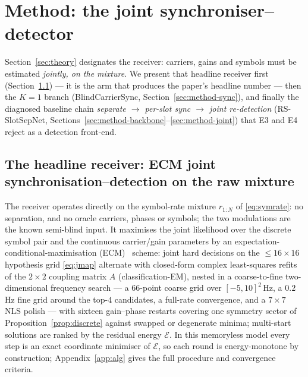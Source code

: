 \documentclass[journal]{IEEEtran}
\begin{document}
\section{Method: the joint synchroniser--detector}
\label{sec:method}

Section~\ref{sec:theory} designates the receiver: carriers, gains and
symbols must be estimated \emph{jointly, on the mixture}. We present
that headline receiver first
(Section~\ref{sec:method-jointmix}) --- it is the arm that produces
the paper's headline number --- then the $K{=}1$ branch
(BlindCarrierSync, Section~\ref{sec:method-sync}), and finally the
diagnosed baseline chain \emph{separate $\to$ per-slot sync $\to$
joint re-detection} (RS-SlotSepNet,
Sections~\ref{sec:method-backbone}--\ref{sec:method-joint}) that E3
and E4 reject as a detection front-end.

\subsection{The headline receiver: ECM joint
synchronisation--detection on the raw mixture}
\label{sec:method-jointmix}

The receiver operates directly on the symbol-rate mixture $r_{1:N}$
of \eqref{eq:symrate}: no separation, and no oracle carriers, phases or
symbols; the two modulations are the known semi-blind input. It
maximises the joint likelihood over the discrete symbol pair and the
continuous carrier/gain parameters by an
expectation-conditional-maximisation (ECM)~\cite{meng1993ecm} scheme:
joint hard decisions on the $\leq 16 \times 16$ hypothesis grid
\eqref{eq:jmap} alternate with closed-form complex least-squares
refits of the $2 \times 2$ coupling matrix $A$ (classification-EM),
nested in a coarse-to-fine two-dimensional frequency search --- a
$66$-point coarse grid over $[-5, 10]^2$\,Hz, a $0.2$\,Hz fine grid
around the top-$4$ candidates, a full-rate convergence, and a
$7 \times 7$ NLS polish --- with sixteen gain--phase restarts covering
one symmetry sector of
Proposition~\ref{prop:discrete} against swapped or degenerate minima;
multi-start solutions are ranked by the residual energy $\mathcal{E}$.
In this memoryless model every step is an exact coordinate minimiser of
$\mathcal{E}$, so each round is energy-monotone by construction;
Appendix~\ref{app:alg} gives the full procedure and convergence
criteria.
\end{document}
